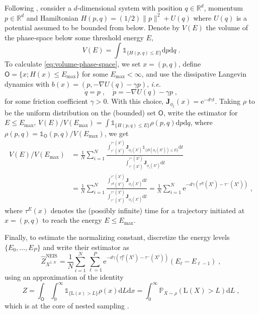 \documentclass{article}
\def\rmd{\operatorname{d}\hspace{-2pt}}
\def\PP{\mathbb{P}}
\def\rset{\mathbb{R}}
\def\rmd{\mathrm{d}}
\def\eqsp{\,}
\def\ie{\textit{i.e.}}
\def\eqsp{\;}
\newcommand{\1}{\mathds{1}}
\newcommand{\indi}[1]{\1_{#1}}
\newcommand{\indiacc}[1]{\mathds{1}_{\{ #1   \}}}
\def\proposal{\rho}
\newcommand{\chunku}[3]{#1^{#2:#3}}
\def\Jac{\mathbf{J}}
\newcommand{\JacOp}[1]{\Jac_{#1}}
\def\const{Z}
\def\mso{\mathsf{O}}
\def\rset{\mathbb{R}}
\def\rmd{\mathrm{d}}
\def\rme{\mathrm{e}}
\def\likelihood{\mathrm{L}}
\def\NEIS{\ensuremath{\operatorname{NEIS}}}
\begin{document}
Following \cite{rotskoff:vanden-eijden:2019}, consider a $d$-dimensional system with position $q \in \rset^d$, momentum $p \in \rset^d$ and Hamiltonian $H(p,q)= (1/2) \| p \|^2 + U(q)$ where $U(q)$ is a potential assumed to be bounded from below. Denote by $V(E)$ the volume of the phase-space below some threshold energy $E$, 
\begin{equation}
\label{eq:volume-phase-space}
V(E)= \int   \indiacc{H(p,q) \leq E} \rmd p \rmd q \eqsp.
\end{equation}
To calculate \eqref{eq:volume-phase-space}, we set $x= (p,q)$, define $\mso= \{x; H(x) \leq E_{\max}\}$ for some $E_{\max} < \infty$, and use the dissipative Langevin dynamics with $b(x)=(p, - \nabla U(q) - \gamma p)$, \ie\
\[
\dot{q} = p \eqsp, \quad \dot{p} = - \nabla U(q) - \gamma p \eqsp,
\]
for some friction coefficient $\gamma > 0$. With this choice,  $\JacOp{\phi_t}(x) = \rme^{-d\gamma t}$. Taking $\proposal$ to be the uniform distribution on the (bounded) set $\mso$, write the estimator for $E\leq E_{\max}$, $V(E)/V(E_{\max})= \int \indiacc{H(p,q) \leq E} \proposal(p,q) \rmd p \rmd q$, where $\proposal(p,q)= \indi{\mso}(p,q)/V(E_{\max})$, we get
\begin{align}
    \nonumber V(E)/V(E_{\max}) &= \frac{1}{N}\sum_ {i=1}^N \frac{\int_{\tau^-(X^i)}^{\tau^+(X^i)} \JacOp{\phi_t(X^i)} \indiacc{H(\phi_t(X^i))\leq E}\rmd t}{\int_{\tau^-(X^i)}^{\tau^+(X^i)} \JacOp{\phi_t(X^i)} \rmd t} \\&= \frac{1}{N}\sum_ {i=1}^N \frac{\int_{\tau^E(X^i)}^{\tau^+(X^i)} \JacOp{\phi_t(X^i)} \rmd t}{\int_{\tau^-(X^i)}^{\tau^+(X^i)} \JacOp{\phi_t(X^i)} \rmd t}= \frac{1}{N}\sum_ {i=1}^N \rme^{-d\gamma(\tau^E(X^i) - \tau^-(X^i))}\eqsp,
\end{align}
where $\tau^E(x)$  denotes the (possibly infinite) time for a trajectory initiated at $x= (p,q)$ to reach the energy $E \leq E_{\max}$.

Finally, to estimate the normalizing constant, \cite{rotskoff:vanden-eijden:2019} discretize the energy levels $\{E_0,\dots, E_P\}$ and write their estimator as
\begin{equation}
   \widehat{\const}_{\chunku{X}{1}{N}}^{\NEIS} =  \frac{1}{N}\sum_ {i=1}^N \sum_{\ell = 1}^P \rme^{-d\gamma(\tau^E_\ell(X^i) - \tau^-(X^i))} (E_{\ell} - E_{\ell -1}) \eqsp,
\end{equation}
using an approximation of the identity
\[    \const=\int_\mso \int_{0}^{\infty}\indiacc{\likelihood(x)>L}\rho(x) \rmd L \rmd x =\int_0^\infty \PP_{X\sim\rho}(\likelihood(X)> L) \rmd L\eqsp,
\]
which is at the core of nested sampling \cite{chopin:robert:2010}.
\end{document}
